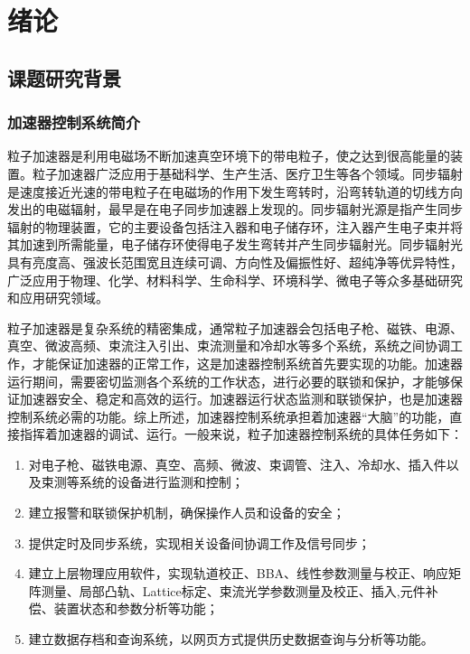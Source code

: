 
\chapter{绪论}

\section{课题研究背景}

\subsection{加速器控制系统简介}
粒子加速器是利用电磁场不断加速真空环境下的带电粒子，使之达到很高能量的装置。粒子加速器广泛应用于基础科学、生产生活、医疗卫生等各个领域\cite{hong2014,Clayton2015}。同步辐射是速度接近光速的带电粒子在电磁场的作用下发生弯转时，沿弯转轨道的切线方向发出的电磁辐射，最早是在电子同步加速器上发现的。同步辐射光源是指产生同步辐射的物理装置，它的主要设备包括注入器和电子储存环，注入器产生电子束并将其加速到所需能量，电子储存环使得电子发生弯转并产生同步辐射光。同步辐射光具有亮度高、强波长范围宽且连续可调、方向性及偏振性好、超纯净等优异特性，广泛应用于物理、化学、材料科学、生命科学、环境科学、微电子等众多基础研究和应用研究领域。

粒子加速器是复杂系统的精密集成，通常粒子加速器会包括电子枪、磁铁、电源、真空、微波高频、束流注入引出、束流测量和冷却水等多个系统，系统之间协调工作，才能保证加速器的正常工作，这是加速器控制系统首先要实现的功能。加速器运行期间，需要密切监测各个系统的工作状态，进行必要的联锁和保护，才能够保证加速器安全、稳定和高效的运行。加速器运行状态监测和联锁保护，也是加速器控制系统必需的功能。综上所述，加速器控制系统承担着加速器“大脑”的功能，直接指挥着加速器的调试、运行。一般来说，粒子加速器控制系统的具体任务如下\cite{zhao2006,Liu2006}：

\begin{enumerate}[itemindent=1em,label=(\arabic*)]
	\item 对电子枪、磁铁电源、真空、高频、微波、束调管、注入、冷却水、插入件以及束测等系统的设备进行监测和控制；
	\item 建立报警和联锁保护机制，确保操作人员和设备的安全；
	\item 提供定时及同步系统，实现相关设备间协调工作及信号同步；
	\item 建立上层物理应用软件，实现轨道校正、BBA、线性参数测量与校正、响应矩阵测量、局部凸轨、Lattice标定、束流光学参数测量及校正、插入,元件补偿、装置状态和参数分析等功能；
	\item 建立数据存档和查询系统，以网页方式提供历史数据查询与分析等功能。
\end{enumerate}

